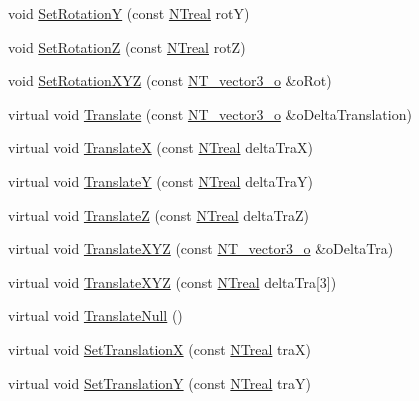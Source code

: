 \begin{DoxyCompactItemize}
\item 
void \hyperlink{class_n_t3_d__object__o_ab7bf5722ed6ada311701bf0c9c0e5a43}{SetRotationY} (const \hyperlink{nt__types_8h_a814a97893e9deb1eedcc7604529ba80d}{NTreal} rotY)
\item 
void \hyperlink{class_n_t3_d__object__o_a66700a0265cb5ceffbe6fa32a073708a}{SetRotationZ} (const \hyperlink{nt__types_8h_a814a97893e9deb1eedcc7604529ba80d}{NTreal} rotZ)
\item 
void \hyperlink{class_n_t3_d__object__o_ae44812853b1b1963ce6b6572daee75b7}{SetRotationXYZ} (const \hyperlink{class_n_t__vector3__o}{NT\_\-vector3\_\-o} \&oRot)
\item 
virtual void \hyperlink{class_n_t3_d__object__o_a5573c6f12b03daf3a8fbd82061f62ed0}{Translate} (const \hyperlink{class_n_t__vector3__o}{NT\_\-vector3\_\-o} \&oDeltaTranslation)
\item 
virtual void \hyperlink{class_n_t3_d__object__o_a7d5e8c8bb5115e23b71e87899e7b330f}{TranslateX} (const \hyperlink{nt__types_8h_a814a97893e9deb1eedcc7604529ba80d}{NTreal} deltaTraX)
\item 
virtual void \hyperlink{class_n_t3_d__object__o_a46d4b1e06520e4e3f8793d79673c7603}{TranslateY} (const \hyperlink{nt__types_8h_a814a97893e9deb1eedcc7604529ba80d}{NTreal} deltaTraY)
\item 
virtual void \hyperlink{class_n_t3_d__object__o_a13fbdc3fc746bcb66cb1d1b6e5a64460}{TranslateZ} (const \hyperlink{nt__types_8h_a814a97893e9deb1eedcc7604529ba80d}{NTreal} deltaTraZ)
\item 
virtual void \hyperlink{class_n_t3_d__object__o_a396b9229db145125a9dcdbe543d682bb}{TranslateXYZ} (const \hyperlink{class_n_t__vector3__o}{NT\_\-vector3\_\-o} \&oDeltaTra)
\item 
virtual void \hyperlink{class_n_t3_d__object__o_af609a39e9c3b1a2cb2089c5dabc2b940}{TranslateXYZ} (const \hyperlink{nt__types_8h_a814a97893e9deb1eedcc7604529ba80d}{NTreal} deltaTra\mbox{[}3\mbox{]})
\item 
virtual void \hyperlink{class_n_t3_d__object__o_ae09da06944eaa5bf948387f24ba1a9ae}{TranslateNull} ()
\item 
virtual void \hyperlink{class_n_t3_d__object__o_a884a3831abe2f2a3a6d133b3a608e6ce}{SetTranslationX} (const \hyperlink{nt__types_8h_a814a97893e9deb1eedcc7604529ba80d}{NTreal} traX)
\item 
virtual void \hyperlink{class_n_t3_d__object__o_afd9f9b2c205075d1d594a7b65fdae2ee}{SetTranslationY} (const \hyperlink{nt__types_8h_a814a97893e9deb1eedcc7604529ba80d}{NTreal} traY)

\end{DoxyCompactItemize}
